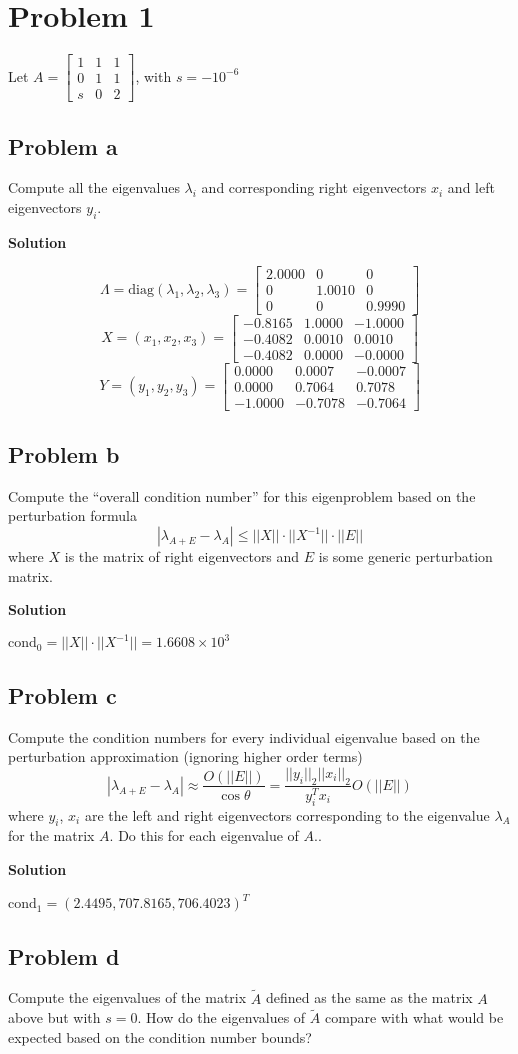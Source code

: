 \documentclass[12pt,oneside,a4paper]{article}
\newcommand{\problem}[1]
{
    \clearpage
    \section*{Problem {#1}}
}
\newcommand{\subproblem}[1]
{
    \subsection*{Problem {#1}}
}
\newcommand{\solution}
{
    \vspace{15pt}
    \noindent\ignorespaces\textbf{\large Solution}\par
}
\begin{document}
\problem{1}
Let 
$A = \begin{bmatrix}
1 & 1 & 1\\
0 & 1 & 1\\
s & 0 & 2
\end{bmatrix}$, with $s = -10^{-6}$

\subproblem{a}
Compute all the eigenvalues $\lambda_{i}$ and corresponding right eigenvectors $x_{i}$ and left eigenvectors $y_{i}$.

\solution
$$\Lambda = \mathrm{diag}(\lambda_{1}, \lambda_{2}, \lambda_{3}) = \begin{bmatrix}
2.0000 & 0 & 0\\
0 & 1.0010 & 0\\
0 & 0 & 0.9990
\end{bmatrix}$$
$$X = (x_{1}, x_{2}, x_{3}) = \begin{bmatrix}
-0.8165 & 1.0000 & -1.0000 \\
-0.4082 & 0.0010 &  0.0010 \\
-0.4082 & 0.0000 & -0.0000
\end{bmatrix}$$
$$Y = (y_{1}, y_{2}, y_{3}) = \begin{bmatrix}
 0.0000 &  0.0007 & -0.0007\\
 0.0000 &  0.7064 &  0.7078\\
-1.0000 & -0.7078 & -0.7064
\end{bmatrix}
$$

\subproblem{b}
Compute the ``overall condition number'' for this eigenproblem based on the perturbation formula
$$|\lambda_{A + E} - \lambda_{A}| \leq ||X|| \cdot ||X^{-1}|| \cdot ||E||$$
where $X$ is the matrix of right eigenvectors and $E$ is some generic perturbation matrix.

\solution
$\mathrm{cond}_{0} = ||X|| \cdot ||X^{-1}|| = 1.6608 \times 10^{3}$

\subproblem{c}
Compute the condition numbers for every individual eigenvalue based on the perturbation approximation (ignoring higher order terms)
$$|\lambda_{A + E} - \lambda_{A}| \approx \frac{O(||E||)}{\cos{\theta}} = \frac{||y_{i}||_2||x_{i}||_2}{y_{i}^{T}x_{i}}O(||E||)$$
where $y_i$, $x_i$ are the left and right eigenvectors corresponding to the eigenvalue $\lambda_{A}$ for the matrix $A$. Do this for each eigenvalue of $A$..

\solution
$\mathrm{cond}_{1} = (2.4495, 707.8165, 706.4023)^T$

\subproblem{d}
Compute the eigenvalues of the matrix $\tilde{A}$ defined as the same as the matrix $A$ above but with $s = 0$. How do the eigenvalues of $\tilde{A}$ compare with what would be expected based on the condition number bounds?
\end{document}

